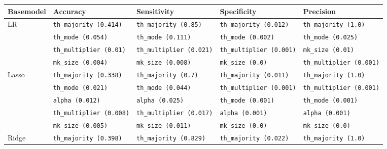 \begin{table}[h]
    \footnotesize
    \begin{adjustwidth}{-3.5cm}{}
        \begin{tabular}{lllll}
        Basemodel & Accuracy                              & Sensitivity                           & Specificity                         & Precision                             \\ \hline
        LR        & \texttt{th\_majority (0.414)}         & \texttt{th\_majority (0.85)}          & \texttt{th\_majority (0.012)}       & \texttt{th\_majority (1.0)}           \\
                  & \texttt{th\_mode (0.054)}             & \texttt{th\_mode (0.111)}             & \texttt{th\_mode (0.002)}           & \texttt{th\_mode (0.025)}             \\
                  & \texttt{th\_multiplier (0.01)}        & \texttt{th\_multiplier (0.021)}       & \texttt{th\_multiplier (0.001)}     & \texttt{mk\_size (0.01)}              \\
                  & \texttt{mk\_size (0.004)}             & \texttt{mk\_size (0.008)}             & \texttt{mk\_size (0.0)}             & \texttt{th\_multiplier (0.001)}       \\
        Lasso     & \texttt{th\_majority (0.338)}         & \texttt{th\_majority (0.7)}           & \texttt{th\_majority (0.011)}       & \texttt{th\_majority (1.0)}           \\
                  & \texttt{th\_mode (0.021)}             & \texttt{th\_mode (0.044)}             & \texttt{th\_multiplier (0.001)}     & \texttt{th\_multiplier (0.001)}       \\
                  & \texttt{alpha (0.012)}                & \texttt{alpha (0.025)}                & \texttt{th\_mode (0.001)}           & \texttt{th\_mode (0.001)}             \\
                  & \texttt{th\_multiplier (0.008)}       & \texttt{th\_multiplier (0.017)}       & \texttt{alpha (0.001)}              & \texttt{alpha (0.001)}                \\
                  & \texttt{mk\_size (0.005)}             & \texttt{mk\_size (0.011)}             & \texttt{mk\_size (0.0)}             & \texttt{mk\_size (0.0)}               \\
        Ridge     & \texttt{th\_majority (0.398)}         & \texttt{th\_majority (0.829)}         & \texttt{th\_majority (0.022)}       & \texttt{th\_majority (1.0)}           \\

\end{tabular}
\end{adjustwidth}
\end{table}
